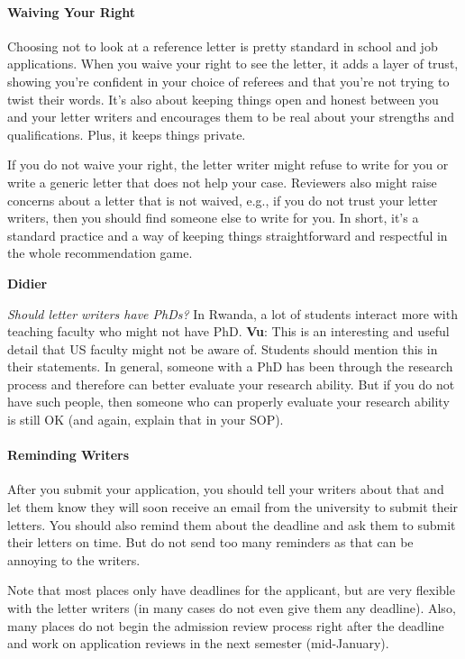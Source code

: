 \documentclass[oneside,11pt,dvipsnames]{book}
\newenvironment{commentbox}[1][]{
  \small
  \begin{mybox}
    {\small \textbf{#1}}
  }{
  \end{mybox}
}
\begin{document}
\paragraph{Waiving Your Right}  Choosing not to look at a reference letter is pretty standard in school and job applications. When you waive your right to see the letter, it adds a layer of trust, showing you're confident in your choice of referees and that you're not trying to twist their words. It's also about keeping things open and honest between you and your letter writers and encourages them to be real about your strengths and qualifications. Plus, it keeps things private.

If you do not waive your right,  the letter writer might refuse to write for you or write a generic letter that does not help your case.  Reviewers also might raise concerns about a letter that is not waived, e.g., if you do not trust your letter writers, then you should find someone else to write for you. In short, it's a standard practice and a way of keeping things straightforward and respectful in the whole recommendation game.

\begin{commentbox}[Didier]
  \emph{Should letter writers have PhDs?}  In Rwanda, a lot of students interact more with teaching faculty who might not have PhD.
  \tcblower
  \textbf{Vu}: This is an interesting and useful detail that US faculty might not be aware of. Students should mention this in their statements. In general, someone with a PhD has been through the research process and therefore can better evaluate your research ability.  But if you do not have such people, then someone who can properly evaluate your research ability is still OK (and again, explain that in your SOP).
\end{commentbox}

\paragraph{Reminding Writers} After you submit your application, you should tell your writers about that and let them know they will soon receive an email from the university to submit their letters.  You should also remind them about the deadline and ask them to submit their letters on time.  But do not send too many reminders as that can be annoying to the writers.

Note that most places only have deadlines for the applicant, but are very flexible with the letter writers (in many cases do not even give them any deadline).  Also, many places do not begin the admission review process right after the deadline and work on application reviews in the next semester (mid-January).
\end{document}
